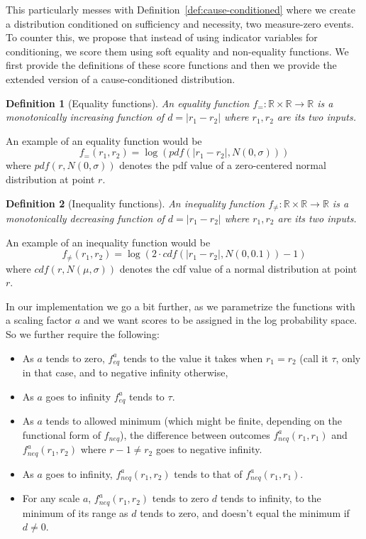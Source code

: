 \documentclass{article}
\newtheorem{definition}{Definition}
\begin{document}
This particularly messes with Definition~\ref{def:cause-conditioned} where we create a distribution conditioned on sufficiency and necessity, two measure-zero events. To counter this, we propose that instead of using indicator variables for conditioning, we score them using soft equality and non-equality functions. We first provide the definitions of these score functions and then we provide the extended version of a cause-conditioned distribution.

\begin{definition}[Equality functions]
    An equality function \(f_= : \mathbb{R} \times \mathbb{R} \rightarrow \mathbb{R}\) is a monotonically increasing function of \(d = |r_1 - r_2|\) where \(r_1, r_2\) are its two inputs. 
\end{definition}

\noindent An example of an equality function would be \[f_=(r_1, r_2) = \log{(\mathit{pdf}(|r_1 - r_2|, N(0, \sigma)))}\] where \(\mathit{pdf}(r, N(0, \sigma))\) denotes the pdf value of a zero-centered normal distribution at point \(r\).

\begin{definition}[Inequality functions]
    An inequality function \(f_{\neq} : \mathbb{R} \times \mathbb{R} \rightarrow \mathbb{R}\) is a monotonically decreasing function of \(d =|r_1 - r_2|\) where \(r_1, r_2\) are its two inputs. 
\end{definition}

\noindent An example of an inequality function would be \[f_{\neq}(r_1, r_2) = \log{(2 \cdot \mathit{cdf}(|r_1 - r_2|, N(0, 0.1)) - 1)}\] where \(\mathit{cdf}(r, N(\mu, \sigma))\) denotes the cdf value of a normal distribution at point \(r\).


In our implementation we go a bit further, as we parametrize the functions with a scaling factor $a$ and we want scores to be assigned in the log probability space. So we further require the following:
\begin{itemize}
\item  As $a$ tends to zero, $f_{eq}^a$ tends to the value it takes when $r_1=r_2$ (call it $\tau$, only in that case, and
to negative infinity otherwise, 
\item As $a$ goes to infinity $f_{eq}^a$ tends to $\tau$.

\item As $a$ tends to allowed minimum (which might be finite, depending on  the functional form of $f_{neq}$), the difference between outcomes $f_{neq}^a(r_1,r_1)$ and $f_{neq}^a(r_1,r_2)$ where $r-1 \neq r_2$ goes to negative infinity.

\item As $a$ goes to infinity, $f_{neq}^a(r_1,r_2)$ tends to that of $f_{neq}^a(r_1,r_1)$.

\item For any scale $a$, $f_{neq}^a(r_1,r_2)$ tends to zero
     $d$ tends to infinity, to the minimum of its range as $d$ tends to zero, and doesn't equal the minimum if $d\neq 0$.
\end{itemize}
\end{document}
